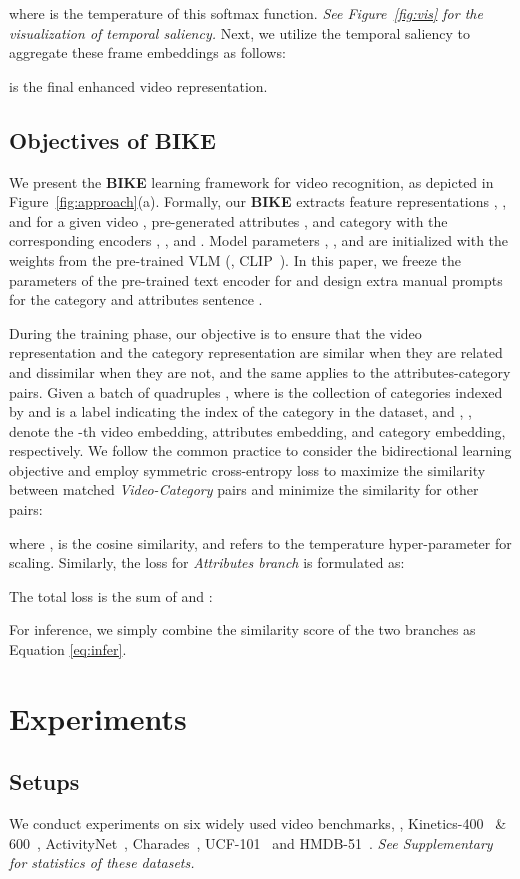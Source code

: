 \documentclass[10pt,twocolumn,letterpaper]{article}
\begin{document}
where  is the temperature of this softmax function. 
\emph{See Figure~\ref{fig:vis} for the visualization of temporal saliency.}
Next, we utilize the temporal saliency to aggregate these frame embeddings as follows: 

  is the final enhanced video representation.



\subsection{Objectives of BIKE}
We present the \textbf{BIKE} learning framework for video recognition, as depicted in Figure~\ref{fig:approach}(a). 
Formally, our \textbf{BIKE} extracts feature representations , , and  for a given video , pre-generated attributes , and category  with the corresponding encoders , , and . 
Model parameters , , and  are initialized with the weights from the pre-trained VLM (\eg, CLIP~\cite{CLIP}).
In this paper, we freeze the parameters of the pre-trained text encoder for  and design extra manual prompts for the category  and attributes sentence . 

During the training phase, our objective is to ensure that the video representation  and the category representation  are similar when they are related and dissimilar when they are not, and the same applies to the attributes-category pairs. 
Given a batch of  quadruples , where  is the collection of  categories indexed by  and  is a label indicating the index of the category in the dataset, and , ,  denote the -th video embedding, attributes embedding, and category embedding, respectively.
We follow the common practice \cite{wang2021actionclip,ju2022prompting} to consider the bidirectional learning objective and employ symmetric cross-entropy loss to maximize the similarity between matched \emph{Video-Category} pairs and minimize the similarity for other pairs: 

where ,  is the cosine similarity, and  refers to the temperature hyper-parameter for scaling. 
Similarly, the loss for \emph{Attributes branch} is formulated as:

The total loss  is the sum of  and :

For inference, we simply combine the similarity score of the two branches as Equation \ref{eq:infer}.
 \section{Experiments}
\subsection{Setups}
We conduct experiments on six widely used video benchmarks, \ie, Kinetics-400~\cite{kay2017kinetics} \& 600~\cite{k600}, ActivityNet~\cite{caba2015activitynet}, Charades~\cite{charades}, UCF-101~\cite{ucf101} and HMDB-51~\cite{hmdb}. 
\emph{See Supplementary for statistics of these datasets.}
\end{document}
